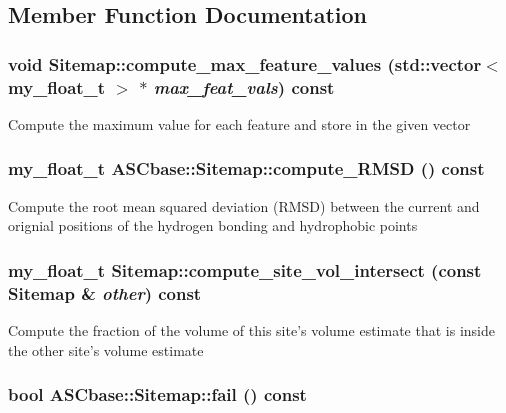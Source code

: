 \subsection{Member Function Documentation}
\subsubsection{\setlength{\rightskip}{0pt plus 5cm}void Sitemap::compute\_\-max\_\-feature\_\-values (std::vector$<$ my\_\-float\_\-t $>$ $\ast$ {\em max\_\-feat\_\-vals}) const}\label{classASCbase_1_1Sitemap_2fc4a9ede3730c0cd6fdadc97f00864b}


Compute the maximum value for each feature and store in the given vector 
\subsubsection{\setlength{\rightskip}{0pt plus 5cm}my\_\-float\_\-t ASCbase::Sitemap::compute\_\-RMSD () const\hspace{0.3cm}{\tt  [inline]}}\label{classASCbase_1_1Sitemap_81fe70b16f0e030e8c20923fc2e66a49}


Compute the root mean squared deviation (RMSD) between the current and orignial positions of the hydrogen bonding and hydrophobic points 
\subsubsection{\setlength{\rightskip}{0pt plus 5cm}my\_\-float\_\-t Sitemap::compute\_\-site\_\-vol\_\-intersect (const \bf{Sitemap} \& {\em other}) const}\label{classASCbase_1_1Sitemap_8865b700374d55d3e7b4d6c4cd489f60}


Compute the fraction of the volume of this site's volume estimate that is inside the other site's volume estimate 
\subsubsection{\setlength{\rightskip}{0pt plus 5cm}bool ASCbase::Sitemap::fail () const\hspace{0.3cm}{\tt  [inline]}}\label{classASCbase_1_1Sitemap_1a15e9045f766ba8e80f6411513de6ac}


